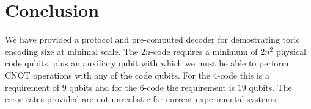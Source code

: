 \section{Conclusion}

We have provided a protocol and pre-computed decoder for demostrating toric encoding size at minimal scale. The $2n$-code requires a minimum of $2n^2$ physical code qubits, plus an auxiliary qubit with which we must be able to perform CNOT operations with any of the code qubits. For the $4$-code this is a requirement of $9$ qubits and for the $6$-code the requirement is $19$ qubits. The error rates provided are not unrealistic for current experimental systems. 

